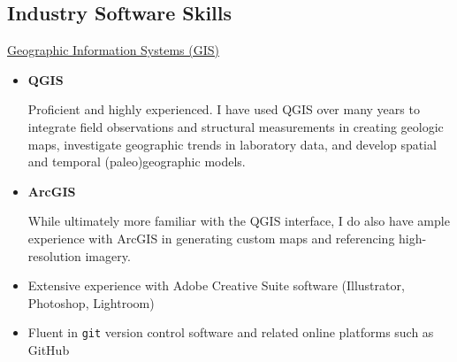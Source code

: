 \documentclass[10pt,a4paper,sans]{moderncv}
\begin{document}
\subsection{Industry Software Skills}
\underline{Geographic Information Systems (GIS)}
\vspace{-5pt}
\begin{multicols}{2}
\begin{itemize}[itemsep=-3pt]
    \item \textbf{QGIS}\\
        \raggedright Proficient and highly experienced. I have
        used QGIS over many years to integrate field observations
        and structural measurements in creating geologic maps, investigate
        geographic trends in laboratory data, and develop spatial and temporal
        (paleo)geographic models.
    \columnbreak
    \item \textbf{ArcGIS}\\
        \raggedright While ultimately more familiar with the QGIS
        interface, I do also have ample experience with ArcGIS in generating
        custom maps and referencing high-resolution imagery. %
\end{itemize}
\end{multicols}
\vspace{-15pt}
\begin{itemize}[itemsep=-3pt]
    \item Extensive experience with Adobe Creative Suite software (Illustrator,
        Photoshop, Lightroom)
    \item Fluent in \texttt{git} version control software and
        related online platforms such as GitHub
\end{itemize}
\end{document}

